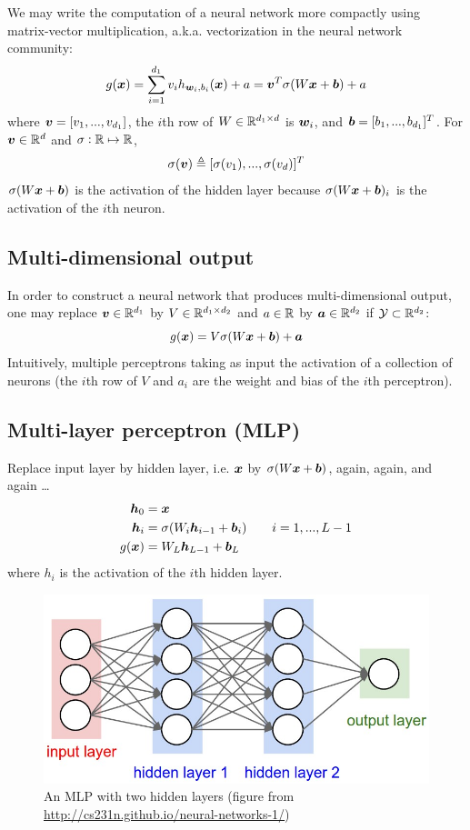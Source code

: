 \documentclass{article}
\begin{document}
We may write the computation of a neural network more compactly using matrix-vector multiplication, a.k.a. vectorization in the neural network community:
\[
g({\bm x})
= \sum_{i = 1}^{d_1} v_i h_{{\bm w}_i, b_i} ({\bm x}) + a
= {\bm v}^T \sigma (W {\bm x} + {\bm b}) + a
\]
where ${\bm v} = [v_1, ..., v_{d_1}]$, the $i$th row of $W \in {\mathbb R}^{d_1 \times d}$ is ${\bm w}_i$, and ${\bm b} = [b_1, ..., b_{d_1}]^T$.
For ${\bm v} \in {\mathbb R}^d$ and $\sigma: {\mathbb R} \mapsto {\mathbb R}$,
\[
\sigma ({\bm v}) \triangleq [\sigma (v_1), ..., \sigma (v_d)]^T
\]
$\sigma (W {\bm x} + {\bm b})$ is the activation of the hidden layer because $\sigma (W {\bm x} + {\bm b})_i$ is the activation of the $i$th neuron.

\subsection{Multi-dimensional output}

In order to construct a neural network that produces multi-dimensional output, one may replace ${\bm v} \in {\mathbb R}^{d_1}$ by $V \in {\mathbb R}^{d_1 \times d_2}$ and $a \in {\mathbb R}$ by ${\bm a} \in {\mathbb R}^{d_2}$ if ${\mathcal Y} \subset {\mathbb R}^{d_2}$:
\[
g({\bm x}) = V \sigma (W {\bm x} + {\bm b}) + {\bm a}
\]
Intuitively, multiple perceptrons taking as input the activation of a collection of neurons (the $i$th row of $V$ and $a_i$ are the weight and bias of the $i$th perceptron).

\subsection{Multi-layer perceptron (MLP)}

Replace input layer by hidden layer, i.e. ${\bm x}$ by $\sigma (W {\bm x} + {\bm b})$, again, again, and again \ldots
\begin{align*}
{\bm h}_0 & = {\bm x} \\
{\bm h}_i & = \sigma (W_i {\bm h}_{i - 1} + {\bm b}_i) \qquad i = 1, ..., L - 1 \\
g({\bm x}) & = W_L {\bm h}_{L - 1} + {\bm b}_L
\end{align*}
where $h_i$ is the activation of the $i$th hidden layer.

\begin{figure}
\centering
\includegraphics[scale=0.2, valign=t]{neural_net2}
\caption{An MLP with two hidden layers (figure from \url{http://cs231n.github.io/neural-networks-1/})}
\end{figure}
\end{document}
